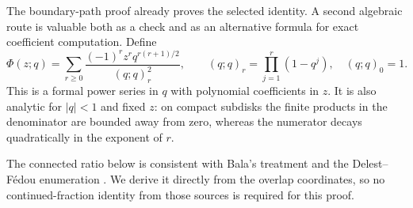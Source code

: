 \documentclass[11pt,letterpaper]{article}
\numberwithin{equation}{section}
\theoremstyle{definition}
\begin{document}
The boundary-path proof already proves the selected identity. A second
algebraic route is valuable both as a check and as an alternative formula
for exact coefficient computation. Define
\begin{equation}
 \Phi(z;q)=\sum_{r\ge0}
 \frac{(-1)^r z^r q^{r(r+1)/2}}{(q;q)_r^2},
 \qquad (q;q)_r=\prod_{j=1}^r(1-q^j),\quad(q;q)_0=1.
 \label{eq:Phi}
\end{equation}
This is a formal power series in $q$ with polynomial coefficients in $z$.
It is also analytic for $|q|<1$ and fixed $z$: on compact subdisks the
finite products in the denominator are bounded away from zero, whereas
the numerator decays quadratically in the exponent of $r$.

The connected ratio below is consistent with Bala's treatment and the
Delest--F\'edou enumeration \cite{bala,delestfedou}. We derive it directly
from the overlap coordinates, so no continued-fraction identity from those
sources is required for this proof.
\end{document}
